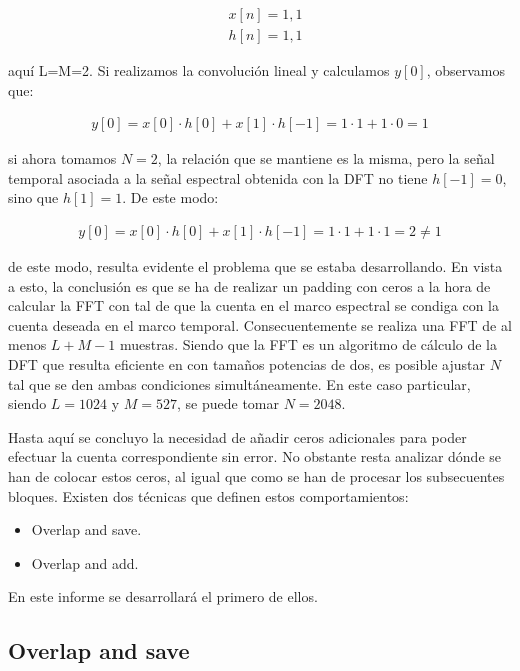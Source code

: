 \begin{align*}
    &x[n] = {1,1} \\
    &h[n] = {1,1}
\end{align*}

\noindent aquí L=M=2. Si realizamos la convolución lineal y calculamos $y[0]$, observamos que:

\begin{align*}
    y[0] = x[0] \cdot h[0] + x[1] \cdot h[-1] = 1 \cdot 1 + 1 \cdot 0 = 1
\end{align*}

\noindent si ahora tomamos $N=2$, la relación que se mantiene es la misma, pero la señal temporal asociada a la señal espectral obtenida con la DFT no tiene $h[-1]=0$, sino que $h[1] = 1$. De este modo:

\begin{align*}
    y[0] = x[0] \cdot h[0] + x[1] \cdot h[-1] = 1 \cdot 1 + 1 \cdot 1 = 2 \neq 1
\end{align*}

\noindent de este modo, resulta evidente el problema que se estaba desarrollando. En vista a esto, la conclusión es que se ha de realizar un padding con ceros a la hora de calcular la FFT con tal de que la cuenta en el marco espectral se condiga con la cuenta deseada en el marco temporal. Consecuentemente se realiza una FFT de al menos $L+M-1$ muestras. Siendo que la FFT es un algoritmo de cálculo de la DFT que resulta eficiente en con tamaños potencias de dos, es posible ajustar $N$ tal que se den ambas condiciones simultáneamente. En este caso particular, siendo $L =1024$ y $M=527$, se puede tomar $N=2048$.

Hasta aquí se concluyo la necesidad de añadir ceros adicionales para poder efectuar la cuenta correspondiente sin error. No obstante resta analizar dónde se han de colocar estos ceros, al igual que como se han de procesar los subsecuentes bloques. Existen dos técnicas que definen estos comportamientos: 

\begin{itemize}
    \item Overlap and save.
    \item Overlap and add.
\end{itemize}

En este informe se desarrollará el primero de ellos. 

\subsection{Overlap and save}

